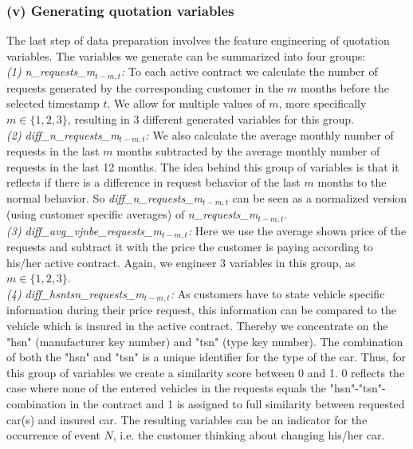 \documentclass[12pt,titlepage]{article}
\begin{document}
\subsubsection*{(v) Generating quotation variables}
The last step of data preparation involves the feature engineering of quotation variables. The variables we generate can be summarized into four groups: \\

\noindent
\textit{(1) n\_requests\_m$_{t - m, t}$:} To each active contract we calculate the number of requests generated by the corresponding customer in the $m$ months before the selected timestamp $t$. We allow for multiple values of $m$, more specifically $m \in \{ 1, 2, 3\}$, resulting in 3 different generated variables for this group. \\

\noindent
\textit{(2) diff\_n\_requests\_m$_{t - m, t}$:} We also calculate the average monthly number of requests in the last $m$ months subtracted by the average monthly number of requests in the last 12 months. The idea behind this group of variables is that it reflects if there is a difference in request behavior of the last $m$ months to the normal behavior. So \textit{diff\_n\_requests\_m$_{t - m, t}$} can be seen as a normalized version (using customer specific averages) of \textit{n\_requests\_m$_{t - m, t}$}. \\

\noindent
\textit{(3) diff\_avg\_vjnbe\_requests\_m$_{t - m, t}$:} Here we use the average shown price of the requests and subtract it with the price the customer is paying according to his/her active contract. Again, we engineer 3 variables in this group, as $m \in \{ 1, 2, 3\}$. \\

\noindent
\textit{(4) diff\_hsntsn\_requests\_m$_{t - m, t}$:} As customers have to state vehicle specific information during their price request, this information can be compared to the vehicle which is insured in the active contract. Thereby we concentrate on the "hsn" (manufacturer key number) and "tsn" (type key number). The combination of both the "hsn" and "tsn" is a unique identifier for the type of the car. Thus, for this group of variables we create a similarity score between 0 and 1. 0 reflects the case where none of the entered vehicles in the requests equals the "hsn"-"tsn"-combination in the contract and 1 is assigned to full similarity between requested car(s) and insured car. The resulting variables can be an indicator for the occurrence of event $N$, i.e. the customer thinking about changing his/her car. \\
\end{document}
